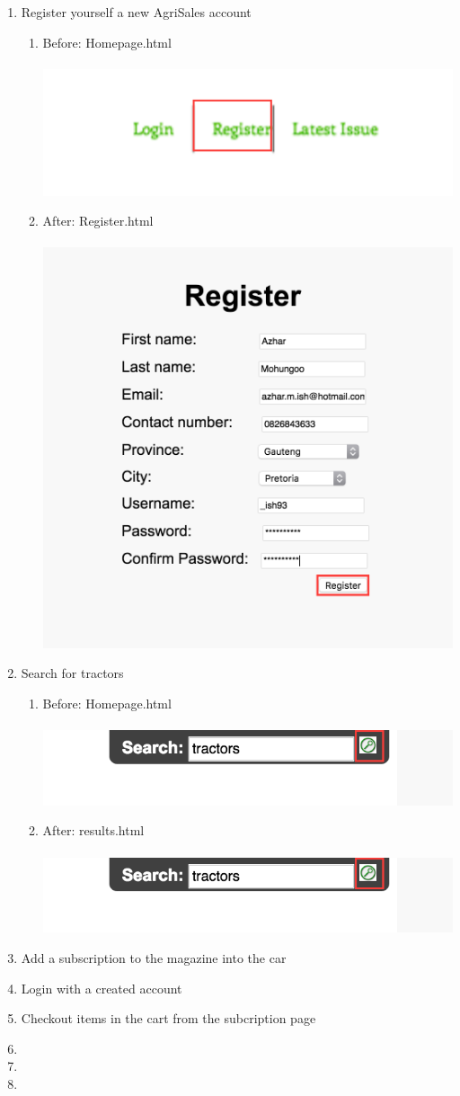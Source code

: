 \documentclass[11pt]{article}
\begin{document}
\begin{enumerate}
\begin{enumerate}
			\end{enumerate} \newpage
		\item Register yourself a new AgriSales account
			\begin{enumerate}
				\item Before: Homepage.html \\ \\
					\includegraphics[width=0.7\linewidth]{../Images/Tasks/Task3Before}
				\item After: Register.html \\ \\
					\includegraphics[width=0.5\linewidth]{../Images/Tasks/Task3After}
			\end{enumerate}
		\item Search for tractors
			\begin{enumerate}
				\item Before: Homepage.html \\ \\
					\includegraphics[width=0.8\linewidth]{../Images/Tasks/Task4Before}
				\item After: results.html \\ \\
					\includegraphics[width=0.5\linewidth]{../Images/Tasks/Task4Before}
			\end{enumerate}
		\item Add a subscription to the magazine into the car
		\item Login with a created account
		\item Checkout items in the cart from the subcription page
		\item 
		\item 
		\item 
	\end{enumerate}
\end{document}
